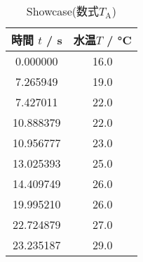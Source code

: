 \begin{table}[H]
\centering
\caption{Showcase(数式$T_\mathrm{A}$)}
\label{tab:py_generals}
\begin{tabular}{cc}
\toprule
  時間 $t$ / \si{s} &  水温$T$ / \si{\celsius} \\
\midrule
          0.000000 &                   16.0 \\
          7.265949 &                   19.0 \\
          7.427011 &                   22.0 \\
         10.888379 &                   22.0 \\
         10.956777 &                   23.0 \\
         13.025393 &                   25.0 \\
         14.409749 &                   26.0 \\
         19.995210 &                   26.0 \\
         22.724879 &                   27.0 \\
         23.235187 &                   29.0 \\
\bottomrule
\end{tabular}
\end{table}
